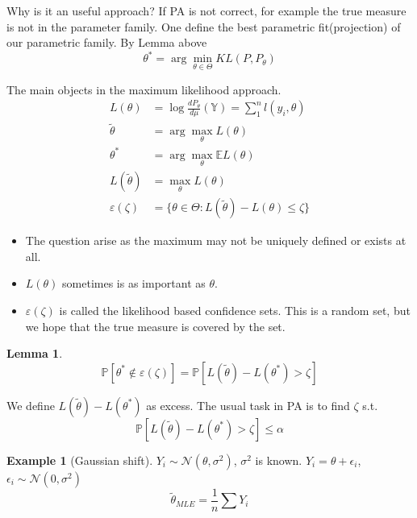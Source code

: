 \documentclass[a4paper,12pt, oneside, fleqn]{book}
\newtheorem{lemma}[theorem]{Lemma}
\theoremstyle{definition}
\newtheorem*{example}{Example}
\theoremstyle{remark}
\begin{document}
Why is it an useful approach? If PA is not correct, for example the true measure is not in the parameter family. One define the best parametric fit(projection) of our parametric family. By Lemma above
\begin{equation*}
	\theta^* = \arg \min_{\theta \in \Theta} KL(P, P_\theta)
\end{equation*}

The main objects in the maximum likelihood approach.
\begin{align*}
	L(\theta) &= \log \frac{dP_\theta}{d\mu}(\mathbb{Y}) = \sum_1^n l(y_i, \theta)\\
	\tilde{\theta} &= \arg \max_\theta L(\theta)\\
	\theta^* &= \arg \max_\theta \mathbb{E}L(\theta)\\
	L(\tilde{\theta}) &= \max_\theta L(\theta)\\
	\varepsilon(\zeta) &= \{ \theta \in \Theta: L(\tilde{\theta}) - L(\theta) \leq \zeta \}
\end{align*}


\begin{itemize}
	\item The question arise as the maximum may not be uniquely defined or exists at all.
	\item  $L(\theta)$ sometimes is as important as $\theta$.
	\item $\varepsilon(\zeta)$ is called the likelihood based confidence sets. This is a random set, but we hope that the true measure is covered by the set.
\end{itemize}



\begin{lemma}
\begin{equation*}
	\mathbb{P} [\theta^* \notin \varepsilon(\zeta)] = \mathbb{P} [ L(\tilde{\theta}) - L(\theta^*) > \zeta]
\end{equation*}
\end{lemma}

We define $L(\tilde{\theta}) - L(\theta^*)$ as excess. The usual task in PA is to find $\zeta$ s.t.
\begin{equation*}
	\mathbb{P} [ L(\tilde{\theta}) - L(\theta^*) > \zeta] \leq \alpha
\end{equation*}



\begin{example}[Gaussian shift]
$Y_i \sim \mathcal{N}(\theta, \sigma^2)$, $\sigma^2$ is known. $Y_i = \theta + \epsilon_i$, $\epsilon_i \sim \mathcal{N}(0, \sigma^2)$
\begin{equation*}
	\tilde{\theta}_{MLE} = \frac{1}{n}\sum Y_i
\end{equation*}

\end{example}
\end{document}

